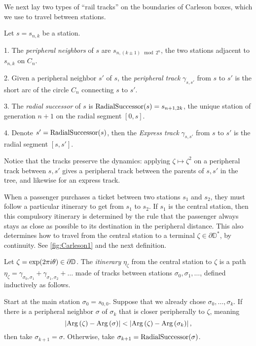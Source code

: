 We next lay two types of \enquote{rail tracks} on the boundaries of Carleson boxes, which we use to travel between stations.

\begin{definition}
Let $s=s_{n,k}$ be a station.

1. The \emph{peripheral neighbors} of $s$ are $s_{n,\left(k\pm1\right)\mod2^{n}}$,
the two stations adjacent to $s_{n,k}$ on $C_{n}$.

2. Given a peripheral neighbor $s'$ of $s$, the \emph{peripheral
	track }$\gamma_{s,s'}$ from $s$ to $s'$
is the short arc of the circle $C_{n}$ connecting $s$ to $s'$.

3. The \emph{radial successor} of $s$ is $\operatorname{RadialSuccessor}(s)=s_{n+1,2k}$, the unique station of generation $n+1$ on the radial segment $[0,s]$.

4. Denote $s'=\operatorname{RadialSuccessor}(s)$, then the \emph{Express track} $\gamma_{s,s'}$ from $s$ to $s'$ is the radial segment $[s,s']$.

\end{definition}

Notice that the tracks preserve the dynamics: applying $\zeta\mapsto \zeta^{2}$
on a peripheral track between $s,s'$ gives a peripheral track between the
parents of $s,s'$ in the tree, and likewise for an express track.

When a passenger purchases a ticket between two stations $s_1$ and $s_2$, they must follow a particular itinerary to get from $s_1$ to $s_2$.
If $s_1$ is the central station, then this compulsory itinerary is determined by the rule that the passenger always stays as close as possible to its destination in the peripheral distance. 
This also determines how to travel from the central station to a terminal $\zeta\in \partial \mathbb D^*$, by continuity. See \cref{fig:Carleson1} and the next definition.


\begin{definition}
Let $\zeta=\exp(2\pi i\theta)\in\partial\mathbb{D}$. The \emph{itinerary} $\eta_\zeta$ from the central station to $\zeta$ is a path 
$\eta_\zeta = \gamma _{\sigma_0,\sigma_1} + \gamma_{\sigma_1,\sigma_2}+\ldots$ made of tracks between stations $\sigma_0,\sigma_1,\ldots$, defined inductively as follows.

Start at the main station $\sigma_0=s_{0,0}$. Suppose that we already chose $\sigma_0,\ldots,\sigma_k$. If there is a peripheral neighbor $\sigma$ of $\sigma_k$ that is closer peripherally to $\zeta$, meaning $$\left|\operatorname{Arg}\left(\zeta\right)-\operatorname{Arg}\left(\sigma\right)\right|
< \left|\operatorname{Arg}\left(\zeta\right)-\operatorname{Arg}\left(\sigma_{k}\right)\right|,$$ then take $\sigma_{k+1}=\sigma$. Otherwise, take 
$\sigma_{k+1}=\operatorname{RadialSuccessor}(\sigma)$.

\end{definition} 

